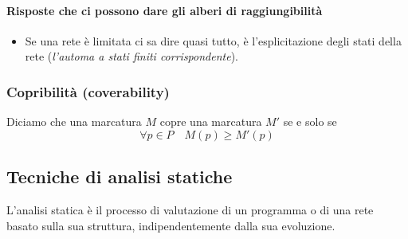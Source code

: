 \documentclass[12pt, twoside, letterpaper]{article}
\begin{document}
			\paragraph{Risposte che ci possono dare gli alberi di raggiungibilità} 
				\begin{itemize}
					\item Se una rete è limitata ci sa dire quasi tutto, è l'esplicitazione degli stati della rete (\textit{l'automa a stati finiti corrispondente}).  
				\end{itemize}
			
			\subsubsection{Copribilità (coverability)}
				Diciamo che una marcatura $M$ copre una marcatura $M'$ se e solo se $$\forall p \in P \quad M(p) \geq M'(p)$$
				
				 
			
			
			
\newpage			
		\subsection{Tecniche di analisi statiche}
			L'analisi statica è il processo di valutazione di un programma o di una rete basato sulla sua struttura, indipendentemente dalla sua evoluzione.
			
		
\end{document}
